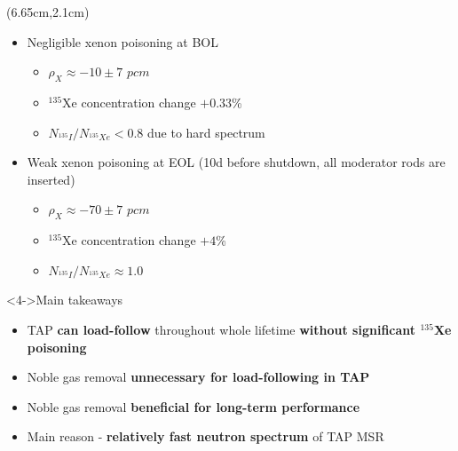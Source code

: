 \begin{frame}
\begin{textblock*}{12.5cm}
\begin{columns}
	\column[t]{5.5cm}
	\begin{textblock*}{6cm}(6.65cm,2.1cm) %
		\fontsize{7}{9}\selectfont
		\begin{itemize}
		\item<1-> Negligible xenon poisoning at BOL
			\begin{itemize}
				\item $\rho_X\approx-10\pm7$ $pcm$
				\item $^{135}$Xe concentration change $+0.33$\%
				\item $N_{^{135}I}/N_{^{135}Xe}<0.8$ due to hard spectrum
			\end{itemize} 
			\item<2-> Weak xenon poisoning at EOL (10d before shutdown, all 
			moderator rods are inserted)
			\begin{itemize}
				\item $\rho_X\approx-70\pm7$ $pcm$
				\item<3-> $^{135}$Xe concentration change $+4$\%
				\item<3-> $N_{^{135}I}/N_{^{135}Xe}\approx1.0$
			\end{itemize}
		\end{itemize}
				\vspace{+5mm}
		\begin{block}<4->{\qquad Main takeaways}
			\begin{itemize}
				\item TAP \textbf{can load-follow} throughout whole
			lifetime \textbf{without significant $^{135}$Xe poisoning}
				\item Noble gas removal \textbf{unnecessary for load-following 
				in TAP}
				\item Noble gas removal \textbf{beneficial for long-term 
				performance}
				\item Main reason - \textbf{relatively fast neutron spectrum} 
				of TAP MSR
			\end{itemize}
		
	\end{block}
	\end{textblock*}
\end{columns}
\end{textblock*}
\end{frame}



